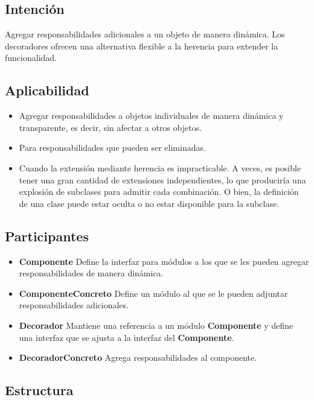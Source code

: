 \subsection*{Intención}
Agregar responsabilidades adicionales a un objeto de manera dinámica. Los decoradores ofrecen una alternativa flexible a la herencia para extender la funcionalidad.

\subsection*{Aplicabilidad}
\begin{itemize}
\item Agregar responsabilidades a objetos individuales de manera dinámica y transparente, es decir, sin afectar a otros objetos.
\item Para responsabilidades que pueden ser eliminadas.
\item Cuando la extensión mediante herencia es impracticable. A veces, es posible tener una gran cantidad de extensiones independientes, lo que produciría una explosión de subclases para admitir cada combinación. O bien, la definición de una clase puede estar oculta o no estar disponible para la subclase.
\end{itemize}

\subsection*{Participantes}
\begin{itemize}
\item \textbf{Componente} Define la interfaz para módulos a los que se les pueden agregar responsabilidades de manera dinámica.
\item \textbf{ComponenteConcreto} Define un módulo al que se le pueden adjuntar responsabilidades adicionales.
\item \textbf{Decorador} Mantiene una referencia a un módulo \textbf{Componente} y define una interfaz que se ajusta a la interfaz del \textbf{Componente}.
\item \textbf{DecoradorConcreto} Agrega responsabilidades al componente.
\end{itemize}


\subsection*{Estructura}

